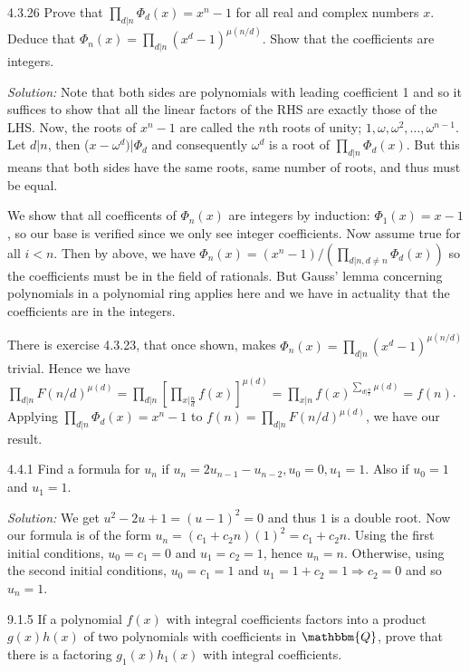 \documentclass{letter}
\newcommand{\tmem}[1]{{\em #1\/}}
\begin{document}
4.3.26 Prove that $\prod_{d | n} \Phi_d (x) = x^n - 1$ for all real and
complex numbers $x$. Deduce that $\Phi_n (x) = \prod_{d | n} (x^d - 1)^{\mu (n
/ d)}$. Show that the coefficients are integers.

{\tmem{Solution:}} Note that both sides are polynomials with leading
coefficient 1 and so it suffices to show that all the linear factors of the
RHS are exactly those of the LHS. Now, the roots of $x^n - 1$ are called the
$n$th roots of unity; $1, \omega, \omega^2, \ldots, \omega^{n - 1}$. Let $d |
n$, then ($x - \omega^d) | \Phi_d$ and consequently $\omega^d$ is a root of
$\prod_{d | n} \Phi_d (x)$. But this means that both sides have the same
roots, same number of roots, and thus must be equal.

We show that all coefficents of $\Phi_n (x)$ are integers by induction:
$\Phi_1 (x) = x - 1$, so our base is verified since we only see integer
coefficients. Now assume true for all $i < n$. Then by above, we have $\Phi_n
(x) = (x^n - 1) / ( \prod_{d | n, d \neq n} \Phi_d (x))$ so the coefficients
must be in the field of rationals. But Gauss' lemma concerning polynomials in
a polynomial ring applies here and we have in actuality that the coefficients
are in the integers.

There is exercise 4.3.23, that once shown, makes $\Phi_n (x) = \prod_{d | n}
(x^d - 1)^{\mu (n / d)}$ trivial. Hence we have $\prod_{d | n} F (n / d)^{\mu
(d)} = \prod_{d|n} [ \prod_{x | \frac{n}{d}} f (x)]^{\mu (d)} = \prod_{x|n} f
(x)^{\sum_{d| \frac{n}{x}} \mu (d)} = f (n)$. Applying $\prod_{d | n} \Phi_d
(x) = x^n - 1$ to $f (n) = \prod_{d | n} F (n / d)^{\mu (d)}$, we have our
result.

4.4.1 Find a formula for $u_n$ if $u_n = 2 u_{n - 1} - u_{n - 2}, u_0 = 0, u_1
= 1$. Also if $u_0 = 1$ and $u_1 = 1$.

{\tmem{Solution:}} We get $u^2 - 2 u + 1 = (u - 1)^2 = 0$ and thus $1$ is a
double root. Now our formula is of the form $u_n = (c_1 + c_2 n) (1)^2 = c_1 +
c_2 n$. Using the first initial conditions, $u_0 = c_1 = 0$ and $u_1 = c_2 =
1$, hence $u_n = n$. Otherwise, using the second initial conditions, $u_0 =
c_1 = 1$ and $u_1 = 1 + c_2 = 1 \Rightarrow c_2 = 0$ and so $u_n = 1$.

9.1.5 If a polynomial $f (x)$ with integral coefficients factors into a
product $g (x) h (x)$ of two polynomials with coefficients in $\mathbbm{Q}$,
prove that there is a factoring $g_1 (x) h_1 (x)$ with integral coefficients.
\end{document}
